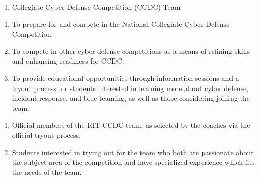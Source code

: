 

\begin{enumerate}
	\item Collegiate Cyber Defense Competition (CCDC) Team
\end{enumerate}


\begin{enumerate}
	\item To prepare for and compete in the National Collegiate Cyber Defense Competition.
	\item To compete in other cyber defense competitions as a means of refining skills and enhancing readiness for CCDC.
      \item To provide educational opportunities through information sessions and a tryout process for students 
            interested in learning more about cyber defense, incident response, and blue teaming, as well as 
            those considering joining the team.
\end{enumerate}


\begin{enumerate}
	\item Official members of the RIT CCDC team, as selected by the coaches via the official tryout process.
      \item Students interested in trying out for the team who both are passionate about the subject area 
            of the competition and have specialized experience which fits the needs of the team.
\end{enumerate}


